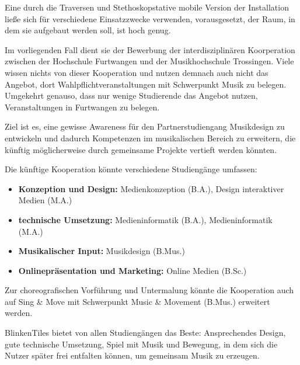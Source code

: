 \clearpage


Eine durch die Traversen und Stethoskopstative mobile Version der Installation ließe sich für verschiedene Einsatzzwecke verwenden, vorausgesetzt, der Raum, in dem sie aufgebaut werden soll, ist hoch genug.

Im vorliegenden Fall dient sie der Bewerbung der interdisziplinären Koorperation zwischen der Hochschule Furtwangen und der Musikhochschule Trossingen. Viele wissen nichts von dieser Kooperation und nutzen demnach auch nicht das Angebot, dort Wahlpflichtveranstaltungen mit Schwerpunkt Musik zu belegen. Umgekehrt genauso, dass nur wenige Studierende das Angebot nutzen, Veranstaltungen in Furtwangen zu belegen.

Ziel ist es, eine gewisse Awareness für den Partnerstudiengang Musikdesign zu entwickeln und dadurch Kompetenzen im musikalischen Bereich zu erweitern, die künftig möglicherweise durch gemeinsame Projekte vertieft werden könnten.

Die künftige Kooperation könnte verschiedene Studiengänge umfassen:

\vspace{0.5em}

\begin{itemize}
	\item \textbf{Konzeption und Design:} Medienkonzeption (B.A.), Design interaktiver Medien (M.A.)
	\item \textbf{technische Umsetzung:} Medieninformatik (B.A.), Medieninformatik (M.A.)
	\item \textbf{Musikalischer Input:} Musikdesign (B.Mus.)
	\item \textbf{Onlinepräsentation und Marketing:} Online Medien (B.Sc.)
\end{itemize}

\vspace{0.5em}

Zur choreografischen Vorführung und Untermalung könnte die Kooperation auch auf Sing \& Move mit Schwerpunkt Music \& Movement (B.Mus.) erweitert werden.

BlinkenTiles bietet von allen Studiengängen das Beste: Ansprechendes Design, gute technische Umsetzung, Spiel mit Musik und Bewegung, in dem sich die Nutzer später frei entfalten können, um gemeinsam Musik zu erzeugen.

\clearpage






